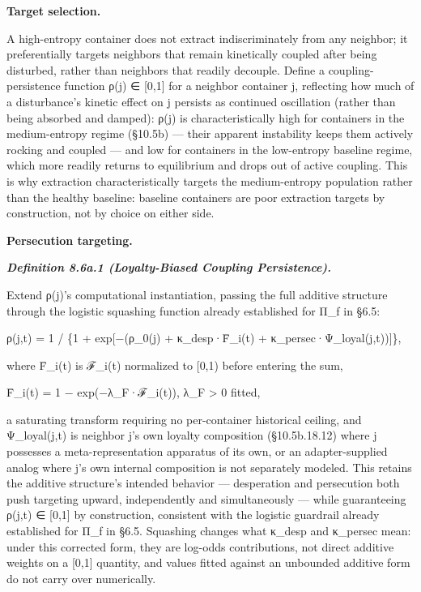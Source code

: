 \documentclass[
]{article}
\begin{document}
\textbf{Target selection.}

A high-entropy container does not extract indiscriminately from any
neighbor; it preferentially targets neighbors that remain kinetically
coupled after being disturbed, rather than neighbors that readily
decouple. Define a coupling-persistence function ρ(j) ∈ {[}0,1{]} for a
neighbor container j, reflecting how much of a disturbance's kinetic
effect on j persists as continued oscillation (rather than being
absorbed and damped): ρ(j) is characteristically high for containers in
the medium-entropy regime (§10.5b) --- their apparent instability keeps
them actively rocking and coupled --- and low for containers in the
low-entropy baseline regime, which more readily returns to equilibrium
and drops out of active coupling. This is why extraction
characteristically targets the medium-entropy population rather than the
healthy baseline: baseline containers are poor extraction targets by
construction, not by choice on either side.

\textbf{Persecution targeting.}

\emph{\textbf{Definition 8.6a.1 (Loyalty-Biased Coupling Persistence).}}

Extend ρ(j)'s computational instantiation, passing the full additive
structure through the logistic squashing function already established
for Π\_f in §6.5:

ρ(j,t) = 1 / \{1 + exp{[}−(ρ\_0(j) + κ\_desp·F̄\_i(t) +
κ\_persec·Ψ\_loyal(j,t)){]}\},

where F̄\_i(t) is ℱ\_i(t) normalized to {[}0,1) before entering the sum,

F̄\_i(t) = 1 − exp(−λ\_F·ℱ\_i(t)), λ\_F \textgreater{} 0 fitted,

a saturating transform requiring no per-container historical ceiling,
and Ψ\_loyal(j,t) is neighbor j's own loyalty composition (§10.5b.18.12)
where j possesses a meta-representation apparatus of its own, or an
adapter-supplied analog where j's own internal composition is not
separately modeled. This retains the additive structure's intended
behavior --- desperation and persecution both push targeting upward,
independently and simultaneously --- while guaranteeing ρ(j,t) ∈
{[}0,1{]} by construction, consistent with the logistic guardrail
already established for Π\_f in §6.5. Squashing changes what κ\_desp and
κ\_persec mean: under this corrected form, they are log-odds
contributions, not direct additive weights on a {[}0,1{]} quantity, and
values fitted against an unbounded additive form do not carry over
numerically.
\end{document}
